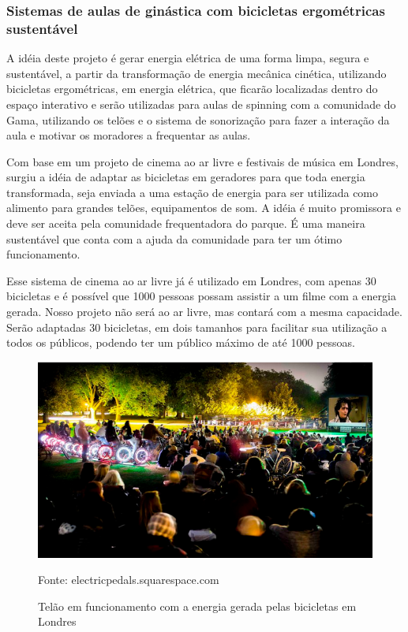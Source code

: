 \subsubsection{Sistemas de aulas de ginástica com bicicletas ergométricas sustentável}

	A idéia deste projeto é gerar energia elétrica de uma forma limpa, segura e sustentável, a partir da transformação de energia mecânica cinética, utilizando bicicletas ergométricas, em energia elétrica, que ficarão localizadas dentro do espaço  interativo e serão utilizadas para aulas de spinning com a comunidade do Gama, utilizando os telões e o sistema de sonorização para fazer a interação da aula e motivar os moradores a frequentar as aulas.

	Com base em um projeto de cinema ao ar livre e festivais de música em Londres, surgiu a idéia de adaptar as bicicletas em geradores para que toda energia transformada, seja enviada a uma estação de energia para ser utilizada como alimento para grandes telões, equipamentos de som. A idéia é muito promissora e deve ser aceita pela comunidade frequentadora do parque. É uma maneira sustentável que conta com a ajuda da comunidade para ter um ótimo funcionamento.
	
	Esse sistema de cinema ao ar livre já é utilizado em Londres, com apenas 30 bicicletas e é possível que 1000 pessoas possam assistir a um filme com a energia gerada. Nosso projeto não será ao ar livre, mas contará com a mesma capacidade. Serão adaptadas 30 bicicletas, em dois tamanhos para facilitar sua utilização a todos os públicos, podendo ter um público máximo de até 1000 pessoas.
	
\begin{figure}[H]
	 \centering
	\label{Funcionamento do Telão por energia gerada por bicicletas}
	 \includegraphics[keepaspectratio=true,scale=0.8]{figuras/TelaoFuncionamentoEnergiaBicicleta.png}
	 \caption{Telão em funcionamento com a energia gerada pelas bicicletas em Londres}
	 \small{Fonte: electricpedals.squarespace.com}
\end{figure}

